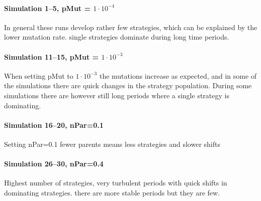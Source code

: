 \paragraph{Simulation 1--5, pMut = $1\cdot 10^{-4}$}
In general these runs develop rather few strategies, which can be explained by the lower mutation rate. single strategies dominate during long time periods. 
\mypar



\paragraph{Simulation 11--15, pMut = $1\cdot 10^{-3}$}
When setting pMut to $1\cdot10^{-3}$ the mutations increase as expected, and in some of the simulations there are quick changes in the strategy population. During some simulations there are however still long periods where a single strategy is dominating.



\paragraph{Simulation 16--20, nPar=0.1}
Setting nPar=0.1 fewer parents means less strategies and slower shifts



\paragraph{Simulation 26--30, nPar=0.4}
Highest number of strategies, very turbulent periods with quick shifts in dominating strategies. there are more stable periods but they are few.

